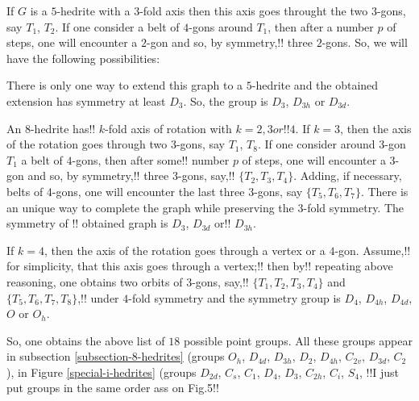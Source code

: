 \documentclass[12pt]{article}
\begin{document}
\begin{remark!!}
If $G$ is a $5$-hedrite with a $3$-fold axis then this axis goes throught the two $3$-gons, say $T_1$, $T_2$. If one consider a belt of $4$-gons around $T_1$, then after a number $p$ of steps, one will encounter a $2$-gon 
and so, by symmetry,!! three $2$-gons. So, we will have the following possibilities:

\begin{center}
\epsfxsize=60mm
\end{center}

There is only one way to extend this graph to a $5$-hedrite and the obtained extension has symmetry at least $D_3$. So, the group is $D_{3}$, $D_{3h}$ or $D_{3d}$.

An $8$-hedrite has!! $k$-fold axis of rotation with $k=2, 3 or!! 4$. If $k=3$, then the axis of the rotation goes through two $3$-gons, say $T_1$, $T_8$. If one consider around $3$-gon $T_1$ a belt of $4$-gons, 
then after some!! number $p$ of steps, one will encounter a $3$-gon and so, by symmetry,!! three $3$-gons, say,!! $\{T_2, T_3, T_4\}$. Adding, if necessary, belts of $4$-gons, one will encounter the last three $3$-gons, say $\{T_5, T_6, T_7\}$. There is an unique way to complete the graph while preserving the $3$-fold symmetry. The symmetry of !! obtained graph is 
$D_3$, $D_{3d}$ or!! $D_{3h}$. 

If $k=4$, then the axis of the rotation goes through a vertex or a $4$-gon. Assume,!! for simplicity, that this axis goes through a vertex;!! 
then by!! repeating above reasoning, one obtains two orbits of 
$3$-gons, say,!! $\{T_1, T_2, T_3, T_4\}$ and
$\{T_5, T_6, T_7, T_8\}$,!! under $4$-fold symmetry and the symmetry group is $D_4$, $D_{4h}$, $D_{4d}$, $O$ or $O_h$.

So, one obtains the above list of $18$ possible point groups. All these groups appear in subsection \ref{subsection-8-hedrites} (groups 
$O_h$, $D_{4d}$, $D_{3h}$, $D_{2}$, $D_{4h}$, $C_{2v}$, $D_{3d}$, $C_2$),
in Figure \ref{special-i-hedrites} (groups 
$D_{2d}$, $C_{s}$, $C_{1}$, $D_{4}$, $D_{3}$, $C_{2h}$, $C_{i}$, 
$S_{4}$, !!I just put groups in the same order ass on Fig.5!!



\end{remark!!}
\end{document}
